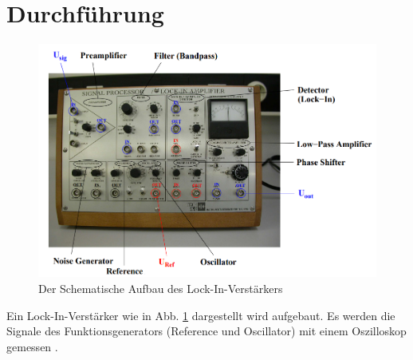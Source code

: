 \section{Durchführung}

\begin{figure}
    \includegraphics[width=\textwidth]{Abbildungen/Aufbau.png}
    \caption{Der Schematische Aufbau des Lock-In-Verstärkers \cite[][]{man:v303}}
    \label{fig:Lock-In-Bild}
\end{figure}
Ein Lock-In-Verstärker wie in Abb. \ref{fig:Lock-In-Bild} dargestellt wird aufgebaut.
Es werden die Signale des Funktionsgenerators (Reference und Oscillator) mit einem Oszilloskop gemessen \cite[][]{man:v303}.

